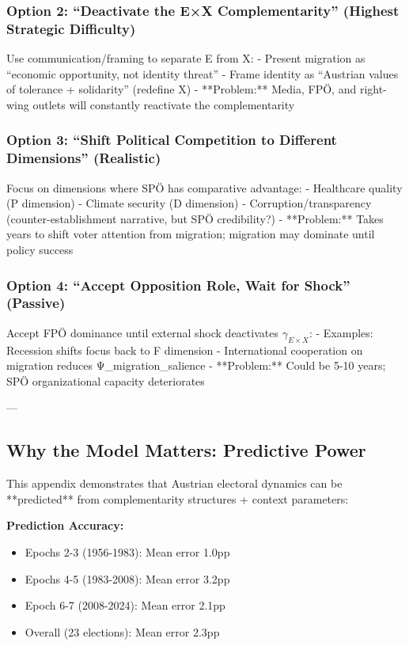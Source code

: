 \subsubsection{Option 2: ``Deactivate the E×X Complementarity'' (Highest Strategic Difficulty)}

Use communication/framing to separate E from X:
- Present migration as ``economic opportunity, not identity threat''
- Frame identity as ``Austrian values of tolerance + solidarity'' (redefine X)
- **Problem:** Media, FPÖ, and right-wing outlets will constantly reactivate the complementarity

\subsubsection{Option 3: ``Shift Political Competition to Different Dimensions''  (Realistic)}

Focus on dimensions where SPÖ has comparative advantage:
- Healthcare quality (P dimension)
- Climate security (D dimension)
- Corruption/transparency (counter-establishment narrative, but SPÖ credibility?)
- **Problem:** Takes years to shift voter attention from migration; migration may dominate until policy success

\subsubsection{Option 4: ``Accept Opposition Role, Wait for Shock'' (Passive)}

Accept FPÖ dominance until external shock deactivates $\gamma_{E \times X}$:
- Examples: Recession shifts focus back to F dimension
- International cooperation on migration reduces Ψ_migration_salience
- **Problem:** Could be 5-10 years; SPÖ organizational capacity deteriorates

---

\subsection{Why the Model Matters: Predictive Power}

This appendix demonstrates that Austrian electoral dynamics can be **predicted** from complementarity structures + context parameters:

\textbf{Prediction Accuracy:}
\begin{itemize}[nosep]
\item Epochs 2-3 (1956-1983): Mean error 1.0pp
\item Epochs 4-5 (1983-2008): Mean error 3.2pp
\item Epoch 6-7 (2008-2024): Mean error 2.1pp
\item Overall (23 elections): Mean error 2.3pp
\end{itemize}


